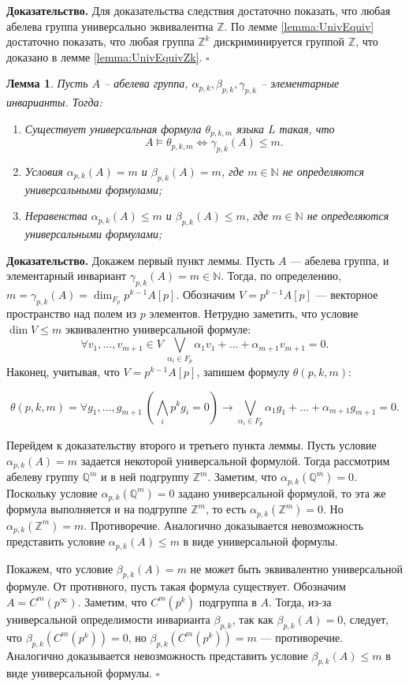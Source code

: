 \documentclass[a4paper,11pt,twoside]{article}
\newtheorem{lemma}{Лемма}[section]
\def\Z{{\mathbb{Z}}}
\def\N{{\mathbb{N}}}
\def\Q{{\mathbb{Q}}}
\begin{document}
{\bf Доказательство.} Для доказательства следствия достаточно показать, что любая абелева группа универсально эквивалентна $\Z$. По лемме \ref{lemma:UnivEquiv} достаточно показать, что любая группа $\Z^k$ дискриминируется группой $\Z$, что доказано в лемме \ref{lemma:UnivEquivZk}. $\square$

\begin{lemma} Пусть $A$ -- абелева группа, $\alpha_{p,k}, \beta_{p,k}, \gamma_{p,k}$ -- элементарные инварианты. Тогда:
\begin{enumerate}
\item Существует универсальная формула $\theta_{p,k,m}$ языка $L$ такая, что 
$$A \models \theta_{p,k,m} \Leftrightarrow \gamma_{p,k}(A) \leq m.$$
\item Условия $\alpha_{p,k}(A) = m$ и $\beta_{p,k}(A) = m$, где $m \in \N$ не определяются универсальными формулами;
\item Неравенства $\alpha_{p,k}(A) \leq m$ и $\beta_{p,k}(A) \leq m$, где $m \in \N$ не определяются универсальными формулами;
\end{enumerate}
\end{lemma}
{\bf Доказательство.} 
Докажем первый пункт леммы. Пусть $A$ --- абелева группа, и элементарный инвариант $\gamma_{p,k}(A) = m \in \N$. Тогда, по определению, $m = \gamma_{p,k} (A) = \dim_{F_p} p^{k-1} A[p]$. Обозначим $V = p^{k-1} A[p]$ --- векторное пространство над полем из $p$ элементов. Нетрудно заметить, что условие $\dim V \leq m$ эквивалентно универсальной формуле: 
$$\forall v_1, \ldots, v_{m+1} \in V \ \bigvee_{\alpha_i \in F_p} \alpha_1v_1 + \ldots + \alpha_{m+1}v_{m+1} = 0.$$
Наконец, учитывая, что $V = p^{k-1}A[p]$, запишем формулу $\theta(p,k,m)$:

$$
\theta(p,k,m) = \forall g_1, \ldots, g_{m+1} \ (\bigwedge_i p^{k}g_{i} = 0) \rightarrow  \bigvee_{\alpha_i \in F_p} \alpha_1g_1 + \ldots + \alpha_{m+1}g_{m+1} = 0.
$$

Перейдем к доказательству второго и третьего пункта леммы. Пусть условие $\alpha_{p,k}(A) = m$ задается некоторой универсальной формулой. Тогда рассмотрим абелеву группу $\Q^m$ и в ней подгруппу $\Z^m$. Заметим, что $\alpha_{p,k}(\Q^m) = 0$. Поскольку условие $\alpha_{p,k}(\Q^m) = 0$ задано универсальной формулой, то эта же формула выполняется и на подгруппе $\Z^m$, то есть $\alpha_{p,k}(\Z^m) = 0$. Но $\alpha_{p,k}(\Z^m) = m$. Противоречие. Аналогично доказывается невозможность представить условие $\alpha_{p,k}(A) \leq m$ в виде универсальной формулы.

Покажем, что условие $\beta_{p,k}(A) = m$ не может быть эквивалентно универсальной формуле. От противного, пусть такая формула существует.  Обозначим $A = C^{m}(p^{\infty})$. Заметим, что $C^{m}(p^k)$ подгруппа в $A$. Тогда, из-за универсальной определимости инварианта $\beta_{p,k}$, так как $\beta_{p,k} (A) = 0$, следует, что $\beta_{p,k} (C^{m}(p^k)) = 0$, но $\beta_{p,k} (C^{m}(p^k)) = m$ --- противоречие. 
Аналогично доказывается невозможность представить условие $\beta_{p,k}(A) \leq m$ в виде универсальной формулы. $\square$
\end{document}
